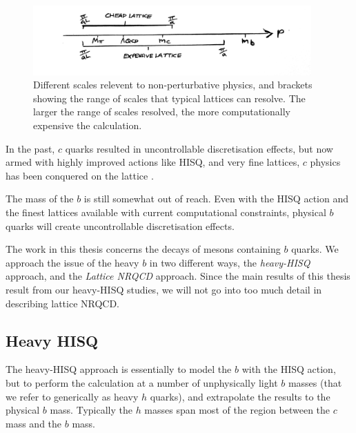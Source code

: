     \begin{figure}
      \vspace{-10pt}
      \begin{center}
        \includegraphics[width=
          0.95\textwidth]{images/scales.jpg}
      \end{center}
      \vspace{-15pt}
      \caption{Different scales relevent to non-perturbative physics, and brackets showing the range of scales that typical lattices can resolve. The larger the range of scales resolved, the more computationally expensive the calculation.}
    \end{figure}

    In the past, $c$ quarks resulted in uncontrollable discretisation effects, but now armed with highly improved actions like HISQ, and very fine lattices, $c$ physics has been conquered on the lattice \cite{Davies:2008nq,Davies:2008hs,Koponen:2011ev,Na:2011mc,Na:2012uh,Na:2012iu,Koponen:2013ila}.

    The mass of the $b$ is still somewhat out of reach. Even with the HISQ action and the finest lattices available with current computational constraints, physical $b$ quarks will create uncontrollable discretisation effects.

    The work in this thesis concerns the decays of mesons containing $b$ quarks. We approach the issue of the heavy $b$ in two different ways, the {\it{heavy-HISQ}} approach, and the {\it{Lattice NRQCD}} approach. Since the main results of this thesis result from our heavy-HISQ studies, we will not go into too much detail in describing lattice NRQCD.

    \subsection{Heavy HISQ}

    The heavy-HISQ approach is essentially to model the $b$ with the HISQ action, but to perform the calculation at a number of unphysically light $b$ masses (that we refer to generically as heavy $h$ quarks), and extrapolate the results to the physical $b$ mass. Typically the $h$ masses span most of the region between the $c$ mass and the $b$ mass.

